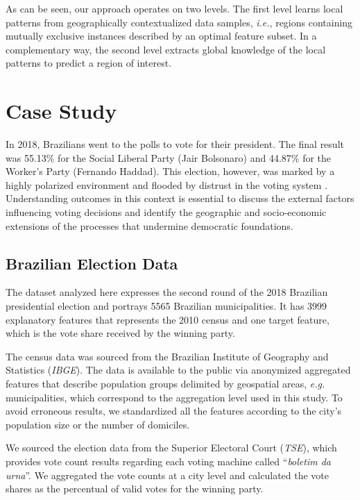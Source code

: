 \documentclass[runningheads]{llncs}
\begin{document}
As can be seen, our approach operates on two levels. The first level learns local patterns from geographically contextualized data samples, \textit{i.e.}, regions containing mutually exclusive instances described by an optimal feature subset. In a complementary way, the second level extracts global knowledge of the local patterns to predict a region of interest.



\section{Case Study}
\label{sec:case_study}

In 2018, Brazilians went to the polls to vote for their president. The final result was 55.13\% for the Social Liberal Party (Jair Bolsonaro) and 44.87\% for the Worker's Party (Fernando Haddad). This election, however, was marked by a highly polarized environment and flooded by distrust in the voting system \cite{lucas2020}. Understanding outcomes in this context is essential to discuss the external factors influencing voting decisions and identify the geographic and socio-economic extensions of the processes that undermine democratic foundations.


\subsection{Brazilian Election Data}
\label{subsec:data}

The dataset analyzed here expresses the second round of the 2018 Brazilian presidential election and portrays 5565 Brazilian municipalities. It has 3999 explanatory features that represents the 2010 census and one target feature, which is the vote share received by the winning party.

The census data was sourced from the Brazilian Institute of Geography and Statistics (\textit{IBGE}). The data is available to the public via anonymized aggregated features that describe population groups delimited by geospatial areas, \textit{e.g.} municipalities, which correspond to the aggregation level used in this study. To avoid erroneous results, we standardized all the features according to the city's population size or the number of domiciles.

We sourced the election data from the Superior Electoral Court (\textit{TSE}), which provides vote count results regarding each voting machine called ``\textit{boletim da urna}''. We aggregated the vote counts at a city level and calculated the vote shares as the percentual of valid votes for the winning party.
\end{document}
